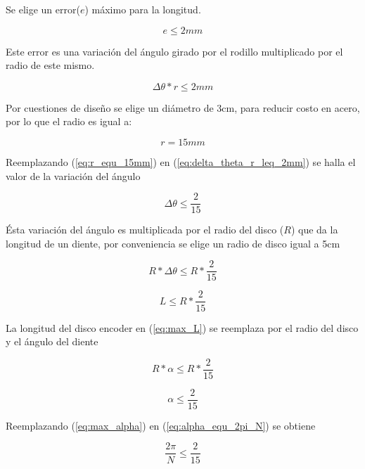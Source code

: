 \documentclass[main_conf.tex]{subfiles}
\begin{document}
Se elige un error($e$) máximo para la longitud.

\begin{equation}
e \leq 2 mm
\end{equation}

Este error es una variación del ángulo girado por el rodillo
multiplicado por el radio de este mismo.

\begin{equation}
\label{eq:delta_theta_r_leq_2mm}
\Delta  \theta *r \leq 2mm
\end{equation}

Por cuestiones de diseño se elige un diámetro de 3cm, para reducir
costo en acero, por lo que el radio es igual a:

\begin{equation}
\label{eq:r_equ_15mm}
r=15mm
\end{equation}

Reemplazando (\ref{eq:r_equ_15mm}) en
(\ref{eq:delta_theta_r_leq_2mm}) se halla el
valor de la variación del ángulo

\begin{equation}
\Delta  \theta\leq\frac{2}{15}
\end{equation}

Ésta variación del ángulo es multiplicada por el radio del disco
($R$) que da la longitud de un diente, por conveniencia se
elige un radio de disco igual a 5cm

\begin{equation}
R*\Delta\theta\leq R*\frac{2}{15}
\end{equation}

\begin{equation}
\label{eq:max_L}
L\leq R*\frac{2}{15}
\end{equation}

La longitud del disco encoder en (\ref{eq:max_L}) se reemplaza
por el radio del disco y el ángulo del diente

\begin{equation}
R*\alpha\leq R*\frac{2}{15}
\end{equation}

\begin{equation}
\label{eq:max_alpha}
\alpha\leq \frac{2}{15}
\end{equation}

Reemplazando (\ref{eq:max_alpha}) en (\ref{eq:alpha_equ_2pi_N}) se
obtiene

\begin{equation}
\frac{2\pi}{N}\leq \frac{2}{15}
\end{equation}
\end{document}

